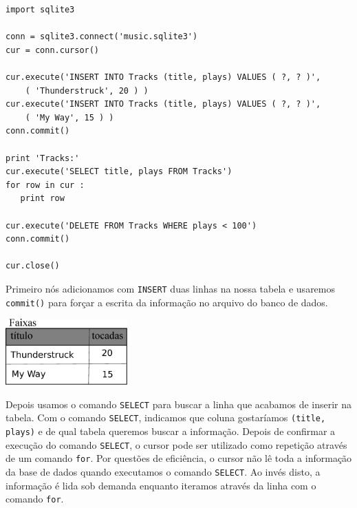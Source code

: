 \beforeverb
\begin{verbatim}
import sqlite3

conn = sqlite3.connect('music.sqlite3')
cur = conn.cursor()

cur.execute('INSERT INTO Tracks (title, plays) VALUES ( ?, ? )', 
    ( 'Thunderstruck', 20 ) )
cur.execute('INSERT INTO Tracks (title, plays) VALUES ( ?, ? )', 
    ( 'My Way', 15 ) )
conn.commit()

print 'Tracks:'
cur.execute('SELECT title, plays FROM Tracks')
for row in cur :
   print row

cur.execute('DELETE FROM Tracks WHERE plays < 100')
conn.commit()

cur.close()
\end{verbatim}
\afterverb
%

Primeiro nós adicionamos com {\tt INSERT} duas linhas na nossa tabela e
usaremos {\tt commit()} para forçar a escrita da informação no arquivo do banco
de dados.

\beforefig
\centerline{\includegraphics[height=1.00in]{figs2/tracks.eps}}
\afterfig


Depois usamos o comando {\tt SELECT} para buscar a linha que acabamos de
inserir na tabela. Com o comando {\tt SELECT}, indicamos que coluna gostaríamos
{\tt (title, plays)} e de qual tabela queremos buscar a informação. Depois
de confirmar a execução do comando {\tt SELECT}, o cursor pode ser utilizado
como repetição através de um comando {\tt for}. Por questões de eficiência, o
cursor não lê toda a informação da base de dados quando executamos o comando
{\tt SELECT}. Ao invés disto, a informação é lida sob demanda enquanto
iteramos através da linha com o comando {\tt for}.

